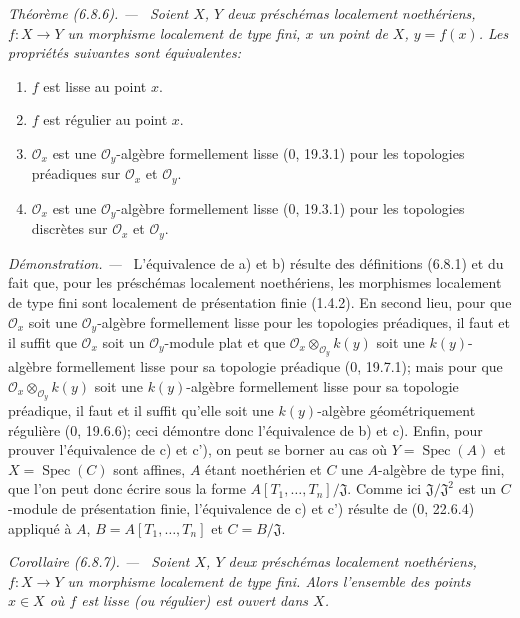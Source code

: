 \documentclass[10pt,oneside]{book}
\newcommand{\oldpage}[2][]{%
  \setcounter{footnote}{0}%
  \marginpar{\scriptsize\textbf{#1}~|~#2}\ignorespaces}
\newenvironment{theorem}[1][]{%
  \par\medskip\noindent\itshape Théorème (#1). ---\ }{\par}
\newenvironment{corollary}[1][]{%
  \par\medskip\noindent\itshape Corollaire (#1). ---\ }{\par}
\newenvironment{proof}{%
  \par\medskip\noindent\textit{Démonstration. ---\ }}{\par}
\begin{document}
\begin{theorem}[6.8.6]
\label{IV.2.s6.8.6-fr}
Soient $X$, $Y$ deux préschémas localement noethériens, $f:X\to Y$ un
morphisme localement de type fini, $x$ un point de $X$, $y=f(x)$. Les
propriétés suivantes sont équivalentes:
\begin{enumerate}
\item[a)] $f$ est lisse au point $x$.
\item[b)] $f$ est régulier au point $x$.
\oldpage[IV-2]{153}
\item[c)] $\mathcal O_x$ est une $\mathcal O_y$-algèbre formellement lisse
(0, 19.3.1) pour les topologies préadiques sur $\mathcal O_x$ et $\mathcal O_y$.
\item[c')] $\mathcal O_x$ est une $\mathcal O_y$-algèbre formellement lisse
(0, 19.3.1) pour les topologies discrètes sur $\mathcal O_x$ et $\mathcal O_y$.
\end{enumerate}
\end{theorem}

\begin{proof}
L'équivalence de a) et b) résulte des définitions (6.8.1) et du fait que,
pour les préschémas localement noethériens, les morphismes localement de type
fini sont localement de présentation finie (1.4.2). En second lieu, pour que
$\mathcal O_x$ soit une $\mathcal O_y$-algèbre formellement lisse pour les
topologies préadiques, il faut et il suffit que $\mathcal O_x$ soit un
$\mathcal O_y$-module plat et que $\mathcal O_x\otimes_{\mathcal O_y}k(y)$
soit une $k(y)$-algèbre formellement lisse pour sa topologie préadique
(0, 19.7.1); mais pour que $\mathcal O_x\otimes_{\mathcal O_y}k(y)$ soit une $k(y)$-algèbre formellement lisse pour sa topologie préadique,
il faut et il suffit qu'elle soit une $k(y)$-algèbre géométriquement régulière
(0, 19.6.6); ceci démontre donc l'équivalence de b) et c). Enfin, pour prouver
l'équivalence de c) et c'), on peut se borner au cas où $Y=\operatorname{Spec}(A)$
et $X=\operatorname{Spec}(C)$ sont affines, $A$ étant noethérien et $C$ une
$A$-algèbre de type fini, que l'on peut donc écrire sous la forme
$A[T_1,\ldots,T_n]/\mathfrak J$. Comme ici $\mathfrak J/\mathfrak J^2$ est un
$C$-module de présentation finie, l'équivalence de c) et c') résulte de
(0, 22.6.4) appliqué à $A$, $B=A[T_1,\ldots,T_n]$ et $C=B/\mathfrak J$.
\end{proof}

\begin{corollary}[6.8.7]
\label{IV.2.s6.8.7-fr}
Soient $X$, $Y$ deux préschémas localement noethériens, $f:X\to Y$ un
morphisme localement de type fini. Alors l'ensemble des points $x\in X$ où
$f$ est lisse (ou régulier) est ouvert dans $X$.
\end{corollary}
\end{document}

